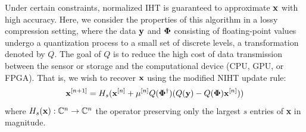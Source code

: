 \documentclass{article}
\begin{document}

Under certain constraints, normalized IHT is guaranteed to approximate ${\bf x}$ with high accuracy. Here, we consider the properties of this algorithm in a lossy compression setting, where the data ${\bf y}$ and ${\bf \Phi}$ consisting of floating-point values undergo a quantization process to a small set of discrete levels, a transformation denoted by $Q$. 
The goal of $Q$ is to reduce the high cost of data transmission between the sensor or storage and the computational device (CPU, GPU, or FPGA). That is, we wish to recover ${\bf x}$ using the  modified NIHT update rule:
 \begin{equation}
     {\bf x}^{[n+1]} = H_s({\bf x}^{[n]} + \mu^{[n]}Q({\bf \Phi}^{\dagger})(Q({\bf y}) - Q({\bf \Phi}){\bf x}^{[n]}))
 \end{equation}
where $H_s({\bf x}): \mathbb{C}^n \rightarrow \mathbb{C}^n$ the operator preserving only the largest $s$  entries of {\bf x} in magnitude. 
 
     
\end{document}
